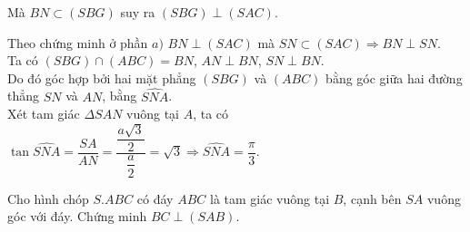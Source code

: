 \begin{ex}
{\begin{listEX}[1]
			Mà $BN \subset  (SBG)$ suy ra $(SBG) \perp(SAC)$.
			\item Theo chứng minh ở phần  $a)$ $BN \perp (SAC)$ mà $SN \subset (SAC) \Rightarrow BN \perp SN$.\\
			Ta có $(SBG) \cap (ABC)=BN$,  $AN \perp BN$, $SN \perp BN$. \\
			Do đó góc hợp bởi hai mặt phẳng $(SBG)$ và $(ABC)$ bằng góc giữa hai đường thẳng $SN$ và $AN$, bằng $\widehat{SNA}$.  \\
			Xét tam giác $\Delta SAN$ vuông tại $A$,  ta có $\tan \widehat{SNA} = \dfrac{SA}{AN}=\dfrac{\dfrac{a\sqrt{3}}{2}}{\dfrac{a}{2}}=\sqrt{3} \Rightarrow \widehat{SNA} = \dfrac{\pi}{3}$.
		\end{listEX}
	 }
\end{ex}

\begin{ex}%
	Cho hình  chóp $S.ABC$ có đáy $ABC$ là tam giác vuông tại $B$, cạnh bên $SA$ vuông góc với đáy. Chứng minh $BC\perp (SAB)$.
\end{ex}


